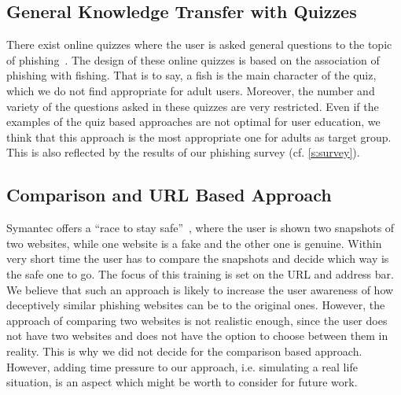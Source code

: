 \subsection{General Knowledge Transfer with Quizzes}
There exist online quizzes where the user is asked general questions to the topic of phishing~\cite{icicibank,onguardonline}. 
The design of these online quizzes is based on the association of phishing with fishing. 
That is to say, a fish is the main character of the quiz, which we do not find appropriate for adult users. 
Moreover, the number and variety of the questions asked in these quizzes are very restricted. 
Even if the examples of the quiz based approaches are not optimal for user education, we think that this approach is the most appropriate one for adults as target group. 
This is also reflected by the results of our phishing survey (cf. \autoref{s:survey}).

\subsection{Comparison and URL Based Approach}
Symantec offers a ``race to stay safe''~\cite{staysafeonline}, where the user is shown two snapshots of two websites, while one website is a fake and the other one is genuine. 
Within very short time the user has to compare the snapshots and decide which way is the safe one to go. 
The focus of this training is set on the URL and address bar. 
We believe that such an approach is likely to increase the user awareness of how deceptively similar phishing websites can be to the original ones. 
However, the approach of comparing two websites is not realistic enough, since the user does not have two websites and does not have the option to choose between them in reality. 
This is why we did not decide for the comparison based approach. 
However, adding time pressure to our approach, i.e. simulating a real life situation, is an aspect which might be worth to consider for future work.


